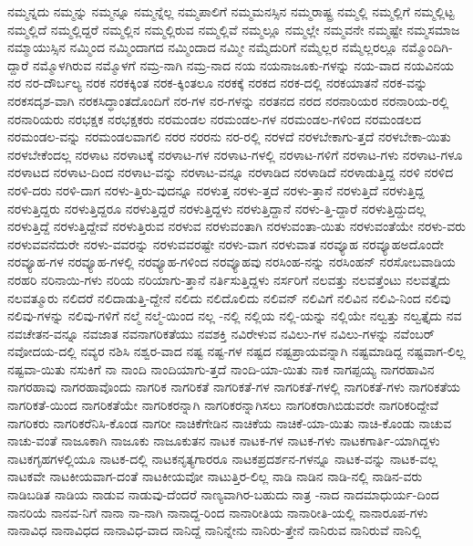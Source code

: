 {ನಮ್ಮನ್ನದು
ನಮ್ಮನ್ನು
ನಮ್ಮನ್ನೂ
ನಮ್ಮನ್ನೆಲ್ಲ
ನಮ್ಮಪಾಲಿಗೆ
ನಮ್ಮಮನಸ್ಸಿನ
ನಮ್ಮರಾಷ್ಟ್ರ
ನಮ್ಮಲ್ಲಿ
ನಮ್ಮಲ್ಲಿಗೆ
ನಮ್ಮಲ್ಲಿಟ್ಟ
ನಮ್ಮಲ್ಲಿದೆ
ನಮ್ಮಲ್ಲಿದ್ದರೆ
ನಮ್ಮಲ್ಲಿನ
ನಮ್ಮಲ್ಲಿರುವ
ನಮ್ಮಲ್ಲಿವೆ
ನಮ್ಮಲ್ಲೂ
ನಮ್ಮಲ್ಲೇ
ನಮ್ಮವನೇ
ನಮ್ಮಷ್ಟೇ
ನಮ್ಮಸಮಾಜ
ನಮ್ಮಾಯುಸ್ಸಿನ
ನಮ್ಮಿಂದ
ನಮ್ಮಿಂದಾಗದ
ನಮ್ಮಿಂದಾದ
ನಮ್ಮೀ
ನಮ್ಮೆದುರಿಗೆ
ನಮ್ಮೆಲ್ಲರ
ನಮ್ಮೆಲ್ಲರಲ್ಲೂ
ನಮ್ಮೊಂದಿಗಿ-ದ್ದಾರೆ
ನಮ್ಮೊಳಗಿರುವ
ನಮ್ಮೊಳಗೆ
ನಮ್ರ-ನಾಗಿ
ನಮ್ರ-ನಾದ
ನಯ
ನಯನಾಜೂಕು-ಗಳನ್ನು
ನಯ-ವಾದ
ನಯವಿನಯ
ನರ
ನರ-ದೌರ್ಬಲ್ಯ
ನರಕ
ನರಕಕ್ಕಿಂತ
ನರಕ-ಕ್ಕಿಂತಲೂ
ನರಕಕ್ಕೆ
ನರಕದ
ನರಕ-ದಲ್ಲಿ
ನರಕಯಾತನೆ
ನರಕ-ವನ್ನು
ನರಕಸದೃಶ-ವಾಗಿ
ನರಕಸಿದ್ಧಾಂತದೊಂದಿಗೆ
ನರ-ಗಳ
ನರ-ಗಳನ್ನು
ನರತನದ
ನರದ
ನರನಾರಿಯರ
ನರನಾರಿಯ-ರಲ್ಲಿ
ನರನಾರಿಯರು
ನರಭಕ್ಷಕ
ನರಭಕ್ಷಕರು
ನರಮಂಡಲ
ನರಮಂಡಲ-ಗಳ
ನರಮಂಡಲ-ಗಳಿಂದ
ನರಮಂಡಲದ
ನರಮಂಡಲ-ವನ್ನು
ನರಮಂಡಲವಾಗಲಿ
ನರರ
ನರರನು
ನರ-ರಲ್ಲಿ
ನರಳದೆ
ನರಳಬೇಕಾಗು-ತ್ತದೆ
ನರಳಬೇಕಾ-ಯಿತು
ನರಳಬೇಕೆಂದಲ್ಲ
ನರಳಾಟ
ನರಳಾಟಕ್ಕೆ
ನರಳಾಟ-ಗಳ
ನರಳಾಟ-ಗಳಲ್ಲಿ
ನರಳಾಟ-ಗಳಿಗೆ
ನರಳಾಟ-ಗಳು
ನರಳಾಟ-ಗಳೂ
ನರಳಾಟದ
ನರಳಾಟ-ದಿಂದ
ನರಳಾಟ-ವನ್ನು
ನರಳಾಟ-ವನ್ನೂ
ನರಳಾಡಿದ
ನರಳಾಡಿದೆ
ನರಳಾಡುತ್ತಿದ್ದ
ನರಳಿ
ನರಳಿದ
ನರಳಿ-ದರು
ನರಳಿ-ದಾಗ
ನರಳು-ತ್ತಿರು-ವುದನ್ನೂ
ನರಳುತ್ತ
ನರಳು-ತ್ತದೆ
ನರಳು-ತ್ತಾನೆ
ನರಳುತ್ತಿದೆ
ನರಳುತ್ತಿದ್ದ
ನರಳುತ್ತಿದ್ದರು
ನರಳುತ್ತಿದ್ದರೂ
ನರಳುತ್ತಿದ್ದರೆ
ನರಳುತ್ತಿದ್ದಳು
ನರಳುತ್ತಿದ್ದಾನೆ
ನರಳು-ತ್ತಿ-ದ್ದಾರೆ
ನರಳುತ್ತಿದ್ದುದಲ್ಲ
ನರಳುತ್ತಿದ್ದೆ
ನರಳುತ್ತಿದ್ದೇವೆ
ನರಳುತ್ತಿರುವ
ನರಳುವ
ನರಳುವಂತಾಗಿ
ನರಳುವಂತಾ-ಯಿತು
ನರಳುವಂತೆಯೇ
ನರಳು-ವರು
ನರಳುವವನೆದುರೇ
ನರಳು-ವವರನ್ನು
ನರಳುವವರಷ್ಟೇ
ನರಳು-ವಾಗ
ನರಳುವಾತ
ನರವ್ಯೂಹ
ನರವ್ಯೂಹಅದೊಂದೇ
ನರವ್ಯೂಹ-ಗಳ
ನರವ್ಯೂಹ-ಗಳಲ್ಲಿ
ನರವ್ಯೂಹ-ಗಳಿಂದ
ನರವ್ಯೂಹವು
ನರಸಿಂಹ-ನನ್ನು
ನರಸಿಂಹನ್
ನರಸೋಬವಾಡಿಯ
ನರಹರಿ
ನರಿನಾಯಿ-ಗಳು
ನರಿಯ
ನರಿಯಾಗು-ತ್ತಾನೆ
ನರ್ತಿಸುತ್ತಿದ್ದಳು
ನರ್ಸರಿಗೆ
ನಲವತ್ತು
ನಲವತ್ತೆಂಟು
ನಲವತ್ತೈದು
ನಲವತ್ಮೂರು
ನಲಿದರೆ
ನಲಿದಾಡುತ್ತಿ-ದ್ದೇನೆ
ನಲಿದು
ನಲಿದೊಲಿದು
ನಲಿವನ್
ನಲಿವಿಗೆ
ನಲಿವಿನ
ನಲಿವಿ-ನಿಂದ
ನಲಿವು
ನಲಿವು-ಗಳನ್ನು
ನಲಿವು-ಗಳಿಗೆ
ನಲ್ಮೆ
ನಲ್ಮೆ-ಯಿಂದ
ನಲ್ಲ
-ನಲ್ಲಿ
ನಲ್ಲಿಯ
ನಲ್ಲಿ-ಯನ್ನು
ನಲ್ಲಿಯೇ
ನಲ್ವತ್ತು
ನಲ್ವತ್ತೈದು
ನವ
ನವಚೇತನ-ವನ್ನೂ
ನವಜಾತ
ನವನಾಗರಿಕತೆಯು
ನವಶಕ್ತಿ
ನವಿರೇಳುವ
ನವಿಲು-ಗಳ
ನವಿಲು-ಗಳನ್ನು
ನವೆಂಬರ್
ನವೋದಯ-ದಲ್ಲಿ
ನವ್ಯರ
ನಶಿಸಿ
ನಶ್ವರ-ವಾದ
ನಷ್ಟ
ನಷ್ಟ-ಗಳ
ನಷ್ಟದ
ನಷ್ಟಪ್ರಾಯವನ್ನಾಗಿ
ನಷ್ಟಮಾಡಿದ್ದ
ನಷ್ಟವಾಗ-ಲಿಲ್ಲ
ನಷ್ಟವಾ-ಯಿತು
ನಸುಕಿಗೆ
ನಾ
ನಾಂದಿ
ನಾಂದಿಯಾಗು-ತ್ತದೆ
ನಾಂದಿ-ಯಾ-ಯಿತು
ನಾಕ
ನಾಗಪ್ಪಯ್ಯ
ನಾಗರಹಾವಿನ
ನಾಗರಹಾವು
ನಾಗರಹಾವೊಂದು
ನಾಗರಿಕ
ನಾಗರಿಕತೆ
ನಾಗರಿಕತೆ-ಗಳ
ನಾಗರಿಕತೆ-ಗಳಲ್ಲಿ
ನಾಗರಿಕತೆ-ಗಳು
ನಾಗರಿಕತೆಯ
ನಾಗರಿಕತೆ-ಯಿಂದ
ನಾಗರಿಕತೆಯೇ
ನಾಗರಿಕರನ್ನಾಗಿ
ನಾಗರಿಕರನ್ನಾಗಿಸಲು
ನಾಗರಿಕರಾಗಿಬಿಡುವರೇ
ನಾಗರಿಕರಿದ್ದೇವೆ
ನಾಗರಿಕರು
ನಾಗರಿಕರೆನಿಸಿ-ಕೊಂಡ
ನಾಗರೀ
ನಾಚಿಕೆಗೇಡಿನ
ನಾಚಿಕೆಯ
ನಾಚಿಕೆ-ಯಾ-ಯಿತು
ನಾಚಿ-ಕೊಂಡು
ನಾಚುವ
ನಾಚು-ವಂತೆ
ನಾಜೂಕಾಗಿ
ನಾಜೂಕು
ನಾಜೂಕುತನ
ನಾಟಕ
ನಾಟಕ-ಗಳ
ನಾಟಕ-ಗಳು
ನಾಟಕಗಾರ್ತಿ-ಯಾಗಿದ್ದಳು
ನಾಟಕಗೃಹಗಳಲ್ಲಿಯೂ
ನಾಟಕ-ದಲ್ಲಿ
ನಾಟಕನೃತ್ಯಗಾರರೂ
ನಾಟಕಪ್ರದರ್ಶನ-ಗಳನ್ನೂ
ನಾಟಕ-ವನ್ನು
ನಾಟಕ-ವಲ್ಲ
ನಾಟಕವೇ
ನಾಟಕೀಯವಾಗ-ದಂತೆ
ನಾಟಕೀಯವೋ
ನಾಟುತ್ತಿರ-ಲಿಲ್ಲ
ನಾಡಿ
ನಾಡಿನ
ನಾಡಿ-ನಲ್ಲಿ
ನಾಡಿನ-ವರು
ನಾಡಿಬಡಿತ
ನಾಡಿಯ
ನಾಡುವ
ನಾಡುವು-ದೆಂದರೆ
ನಾಣ್ಯವಾಗಿರ-ಬಹುದು
ನಾತ್ರ
-ನಾದ
ನಾದಮಾಧುರ್ಯ-ದಿಂದ
ನಾನರಿಯೆ
ನಾನವ-ನಿಗೆ
ನಾನಾ
ನಾ-ನಾಗಿ
ನಾನಾದ್ದ-ರಿಂದ
ನಾನಾರೀತಿಯ
ನಾನಾರೀತಿ-ಯಲ್ಲಿ
ನಾನಾರೂಪ-ಗಳು
ನಾನಾವಿಧ
ನಾನಾವಿಧದ
ನಾನಾವಿಧ-ವಾದ
ನಾನಿದ್ದೆ
ನಾನಿನ್ನೇನು
ನಾನಿರು-ತ್ತೇನೆ
ನಾನಿರುವ
ನಾನಿರುವೆ
ನಾನಿಲ್ಲಿ
}
